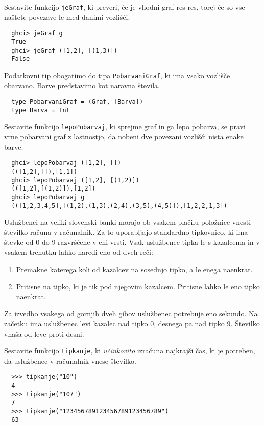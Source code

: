 \documentclass[arhiv]{../izpit}
\begin{document}
\podnaloga
  Sestavite funkcijo \texttt{jeGraf}, ki preveri, če je vhodni
  graf res res, torej če so vse naštete povezave le med danimi vozlišči.
  \begin{verbatim}
  ghci> jeGraf g
  True
  ghci> jeGraf ([1,2], [(1,3)])
  False
  \end{verbatim}

\podnaloga
  Podatkovni tip obogatimo do tipa \texttt{PobarvaniGraf}, ki ima
  vsako vozlišče obarvano. Barve predstavimo kot naravna števila.

  \begin{verbatim}
  type PobarvaniGraf = (Graf, [Barva])
  type Barva = Int
  \end{verbatim}

  Sestavite funkcijo \texttt{lepoPobarvaj}, ki sprejme graf in 
  ga lepo pobarva, se pravi vrne pobarvani graf z lastnostjo, 
  da nobeni dve povezani vozlišči nista enake barve.
  \begin{verbatim}
  ghci> lepoPobarvaj ([1,2], [])
  (([1,2],[]),[1,1])
  ghci> lepoPobarvaj ([1,2], [(1,2)])
  (([1,2],[(1,2)]),[1,2])
  ghci> lepoPobarvaj g
  (([1,2,3,4,5],[(1,2),(1,3),(2,4),(3,5),(4,5)]),[1,2,2,1,3])
  \end{verbatim}


  Uslužbenci na veliki slovenski banki morajo ob vsakem plačilu položnice vnesti številko računa v računalnik.
  Za to uporabljajo standardno tipkovnico, ki ima števke od
  0 do 9 razvrščene v eni vrsti. Vsak uslužbenec tipka le s
  kazalcema in v vsakem trenutku lahko naredi eno od dveh reči:

  \begin{enumerate}
    \item Premakne katerega koli od kazalcev na sosednjo tipko, a
    le enega naenkrat.
    \item Pritisne na tipko, ki je tik pod njegovim kazalcem. Pritisne
    lahko le eno tipko naenkrat.
  \end{enumerate}

 Za izvedbo vsakega od gornjih dveh gibov uslužbenec potrebuje eno sekundo. Na začetku ima uslužbenec levi kazalec nad tipko 0, desnega
 pa nad tipko 9. Številko vnaša od leve proti desni.

 Sestavite funkcijo \texttt{tipkanje}, ki {\em učinkovito}
 izračuna najkrajši čas, ki je potreben, da uslužbenec v
 računalnik vnese številko.

  \begin{verbatim}
  >>> tipkanje("10")
  4
  >>> tipkanje("107")
  7
  >>> tipkanje("123456789123456789123456789")
  63
  \end{verbatim}   
\end{document}
